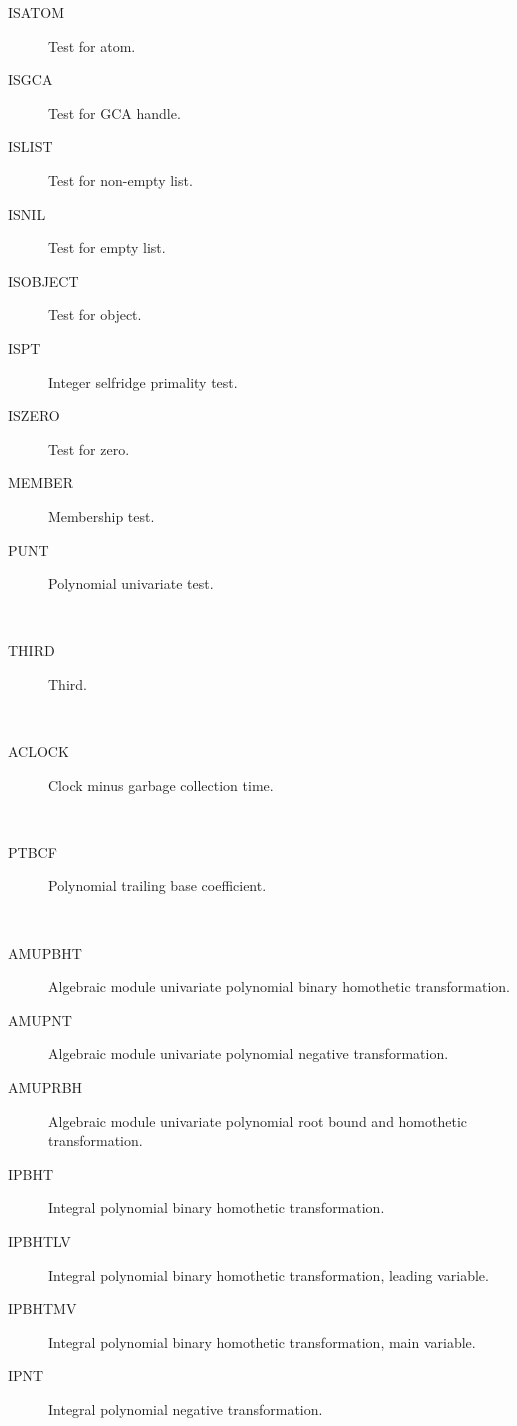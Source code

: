 \begin{description}
  \begin{description}
  \item[ISATOM]  Test for atom.
  \item[ISGCA]  Test for GCA handle.
  \item[ISLIST]  Test for non-empty list.
  \item[ISNIL]  Test for empty list.
  \item[ISOBJECT]  Test for object.
  \item[ISPT]  Integer selfridge primality test.
  \item[ISZERO]  Test for zero.
  \item[MEMBER]  Membership test.
  \item[PUNT]  Polynomial univariate test.
  \end{description}
\item[third] \ \ 
  \begin{description}
  \item[THIRD]  Third.
  \end{description}
\item[time] \ \ 
  \begin{description}
  \item[ACLOCK]  Clock minus garbage collection time.
  \end{description}
\item[trailing] \ \ 
  \begin{description}
  \item[PTBCF]  Polynomial trailing base coefficient.
  \end{description}
\item[transformation] \ \ 
  \begin{description}
  \item[AMUPBHT]  Algebraic module univariate polynomial binary homothetic
    transformation.
  \item[AMUPNT]  Algebraic module univariate polynomial negative
    transformation.
  \item[AMUPRBH]  Algebraic module univariate polynomial root bound and
    homothetic transformation.
  \item[IPBHT]  Integral polynomial binary homothetic transformation.
  \item[IPBHTLV]  Integral polynomial binary homothetic transformation,
    leading variable.
  \item[IPBHTMV]  Integral polynomial binary homothetic transformation, main
    variable.
  \item[IPNT]  Integral polynomial negative transformation.

\end{description}
\end{description}
